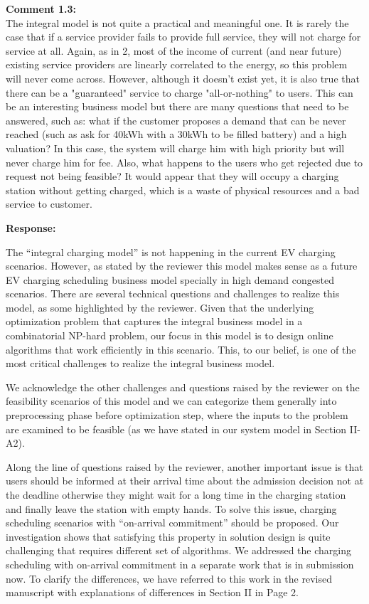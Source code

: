 \documentclass[11pt]{article}
\begin{document}
\vspace{5mm}
{
{\color{blue}\noindent\textbf{Comment 1.3:}\\
The integral model is not quite a practical and meaningful one. It is rarely the case that if a service provider fails to provide full service, they will not charge for service at all. Again, as in 2, most of the income of current (and near future) existing service providers are linearly correlated to the energy, so this problem will never come across. However, although it doesn't exist yet, it is also true that there can be a "guaranteed" service to charge "all-or-nothing" to users. This can be an interesting business model but there are many questions that need to be answered, such as: what if the customer proposes a demand that can be never reached (such as ask for 40kWh with a 30kWh to be filled battery) and a high valuation? In this case, the system will charge him with high priority but will never charge him for fee. Also, what happens to the users who get rejected due to request not being feasible? It would appear that they will occupy a charging station without getting charged, which is a waste of physical resources and a bad service to customer.
}}

\vspace{5mm}
\noindent\textbf{Response:}

The ``integral charging model'' is not happening in the current EV charging scenarios. However, as stated by the reviewer this model makes sense as a future EV charging scheduling business model specially in high demand congested scenarios. There are several technical questions and challenges to realize this model, as some highlighted by the reviewer. Given that the underlying optimization problem that captures the integral business model in a combinatorial NP-hard problem, our focus in this model is to design online algorithms that work efficiently in this scenario. This, to our belief, is one of the most critical challenges to realize the integral business model. 

We acknowledge the other challenges and questions raised by the reviewer on the feasibility scenarios of this model and we can categorize them generally into preprocessing phase before optimization step, where the inputs to the problem are examined to be feasible (as we have stated in our system model in Section II-A2). 

 Along the line of questions raised by the reviewer, another important issue is that users should be informed at their arrival time about the admission decision not at the deadline otherwise they might wait for a long time in the charging station and finally leave the station with empty hands. To solve this issue, charging scheduling scenarios with ``on-arrival commitment'' should be proposed. Our investigation shows that satisfying this property in solution design is quite challenging that requires different set of algorithms. We addressed the charging scheduling with on-arrival commitment in a separate work that is in submission now. To clarify the differences, we have referred to this work in the revised manuscript with explanations of differences in Section II in Page 2. 
 
\end{document}
